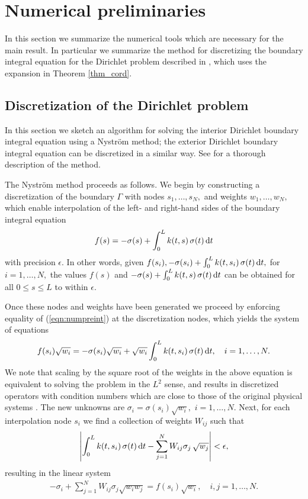 
\section{Numerical preliminaries}
In this section we summarize the numerical tools which are necessary for the main result. In particular we summarize the method for discretizing the boundary integral equation for the Dirichlet problem described in \cite{}, which uses the expansion in Theorem \ref{thm_cord}.
\subsection{Discretization of the Dirichlet problem}\label{sec:disc_dir}
In this section we sketch an algorithm for solving the interior Dirichlet boundary integral equation using a Nystr\"{o}m method; the exterior Dirichlet boundary integral equation can be discretized in a similar way. See \cite{} for a thorough description of the method. 

The Nystr\"{o}m method proceeds as follows. We begin by constructing a discretization of the boundary $\Gamma$ with nodes $s_1,\dots,s_N,$ and weights $w_1,\dots,w_N,$ which enable interpolation of the left- and right-hand sides of the boundary integral equation
\begin{align}\label{eqn:numpreint}
f(s) = -\sigma(s) + \int_0^L k(t,s) \,\sigma(t)\, {\rm d} t
\end{align}
with precision $\epsilon.$ In other words, given $f(s_i),-\sigma(s_i) + \int_0^L k(t,s_i) \,\sigma(t)\, {\rm d} t,$ for $i=1,\dots,N,$ the values $f(s)$ and $-\sigma(s) + \int_0^L k(t,s) \,\sigma(t)\, {\rm d} t$ can be obtained for all $0 \le s \le L$ to within $\epsilon.$

Once these nodes and weights have been generated we proceed by enforcing equality of (\ref{eqn:numpreint}) at the discretization nodes, which yields the system of equations
\begin{align}
f(s_i) \sqrt{w_i} = -\sigma(s_i)\sqrt{w_i} +  \sqrt{w_i}\int_0^L k(t,s_i)\, \sigma(t)\,{\rm d}t,\quad i=1,\dots,N. \label{eqn_1std}
\end{align}
We note that scaling by the square root of the weights in the above equation is equivalent to solving the problem in the $L^2$ sense, and results in discretized operators with condition numbers which are close to those of the original physical systems \cite{bremer3}. The new unknowns are $\sigma_i = \sigma(s_i) \sqrt{w_i},$ $i=1,\dots,N.$ Next, for each interpolation node $s_i$ we find a collection of weights $W_{ij}$ such that
\begin{align}
\left|\int_0^L k(t,s_i)\, \sigma(t)\,{\rm d}t- \sum_{j=1}^N W_{ij} \sigma_j\, \sqrt{w_j} \right| < \epsilon,
\end{align}
resulting in the linear system
\begin{align}
  -\sigma_i +  \sum_{j=1}^N W_{ij} \sigma_j \sqrt{w_i w_j}=f(s_i) \sqrt{w_i},\quad i,j=1,\dots,N. 
\end{align}

